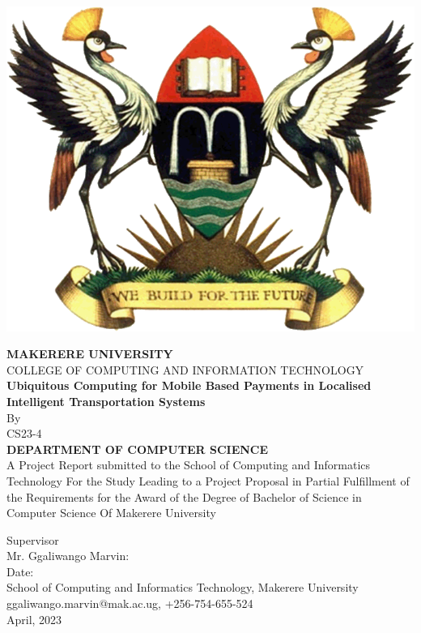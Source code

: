 \documentclass[11pt]{report}
\begin{document}
    \begin{titlepage}
        \begin{center}
            \includegraphics[scale=0.25]{images/muk}

            \textbf{MAKERERE UNIVERSITY}
            \\COLLEGE OF COMPUTING AND INFORMATION TECHNOLOGY
            \vspace{1cm}
            \\{\textbf{ Ubiquitous Computing for Mobile Based Payments in Localised Intelligent Transportation Systems}}
            \vspace{0.5cm}
            \\By
            \\CS23-4
            \vspace{0.5cm}
            \\{\textbf{
                DEPARTMENT OF COMPUTER SCIENCE
            }}
            \vspace{0.5cm}
            \\A Project Report submitted to the School of Computing and Informatics Technology
            For the Study Leading to a Project Proposal in Partial Fulfillment of the
            Requirements for the Award of the Degree of Bachelor of Science in Computer Science
            Of Makerere University
            \vspace{0.5cm}

            Supervisor
            \vspace{0.2cm}
            \\Mr. Ggaliwango Marvin:\dotfill
            \vspace{0.2cm}
            \\Date:\dotfill
            \vspace{0.2cm}
            \\School of Computing and Informatics Technology, Makerere University
            \\ggaliwango.marvin@mak.ac.ug, +256-754-655-524
            \\April, 2023
        \end{center}
    \end{titlepage}
\end{document}
